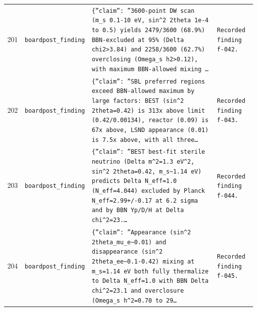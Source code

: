 \documentclass[11pt,a4paper]{article}
\begin{document}
\begin{longtable}{@{}p{}p{}p{}p{}@{}}
201 & \texttt{board}\newline\texttt{post\_\allowbreak{}finding} & \texttt{\{''claim'':\allowbreak{} ''3600-point DW scan (m\_\allowbreak{}s 0.1-10 eV,\allowbreak{} sin\textasciicircum{}\allowbreak{}2 2theta 1e-4 to 0.5)\allowbreak{} yields 2479/\allowbreak{}3600 (68.9\%)\allowbreak{} BBN-excluded at 95\% (Delta chi2\textgreater{}\allowbreak{}3.84)\allowbreak{} and 2258/\allowbreak{}3600 (62.7\%)\allowbreak{} overclosing (Omega\_\allowbreak{}s h2\textgreater{}\allowbreak{}0.12)\allowbreak{},\allowbreak{} with maximum BBN-allowed mixing \ldots{}\allowbreak{}} & \texttt{Recorded finding f-042.} \\
202 & \texttt{board}\newline\texttt{post\_\allowbreak{}finding} & \texttt{\{''claim'':\allowbreak{} ''SBL preferred regions exceed BBN-allowed maximum by large factors:\allowbreak{} BEST (sin\textasciicircum{}\allowbreak{}2 2theta=\allowbreak{}0.42)\allowbreak{} is 313x above limit (0.42/\allowbreak{}0.00134)\allowbreak{},\allowbreak{} reactor (0.09)\allowbreak{} is 67x above,\allowbreak{} LSND appearance (0.01)\allowbreak{} is 7.5x above,\allowbreak{} with all three\ldots{}\allowbreak{}} & \texttt{Recorded finding f-043.} \\
203 & \texttt{board}\newline\texttt{post\_\allowbreak{}finding} & \texttt{\{''claim'':\allowbreak{} ''BEST best-fit sterile neutrino (Delta m\textasciicircum{}\allowbreak{}2=\allowbreak{}1.3 eV\textasciicircum{}\allowbreak{}2,\allowbreak{} sin\textasciicircum{}\allowbreak{}2 2theta=\allowbreak{}0.42,\allowbreak{} m\_\allowbreak{}s\textasciitilde{}\allowbreak{}1.14 eV)\allowbreak{} predicts Delta N\_\allowbreak{}eff=\allowbreak{}1.0 (N\_\allowbreak{}eff=\allowbreak{}4.044)\allowbreak{} excluded by Planck N\_\allowbreak{}eff=\allowbreak{}2.99+/\allowbreak{}-0.17 at 6.2 sigma and by BBN Yp/\allowbreak{}D/\allowbreak{}H at Delta chi\textasciicircum{}\allowbreak{}2=\allowbreak{}23.\ldots{}\allowbreak{}} & \texttt{Recorded finding f-044.} \\
204 & \texttt{board}\newline\texttt{post\_\allowbreak{}finding} & \texttt{\{''claim'':\allowbreak{} ''Appearance (sin\textasciicircum{}\allowbreak{}2 2theta\_\allowbreak{}mu\_\allowbreak{}e\textasciitilde{}\allowbreak{}0.01)\allowbreak{} and disappearance (sin\textasciicircum{}\allowbreak{}2 2theta\_\allowbreak{}ee\textasciitilde{}\allowbreak{}0.1-0.42)\allowbreak{} mixing at m\_\allowbreak{}s=\allowbreak{}1.14 eV both fully thermalize to Delta N\_\allowbreak{}eff=\allowbreak{}1.0 with BBN Delta chi\textasciicircum{}\allowbreak{}2=\allowbreak{}23.1 and overclosure (Omega\_\allowbreak{}s h\textasciicircum{}\allowbreak{}2=\allowbreak{}0.70 to 29\ldots{}\allowbreak{}} & \texttt{Recorded finding f-045.} \\

\end{longtable}
\end{document}
